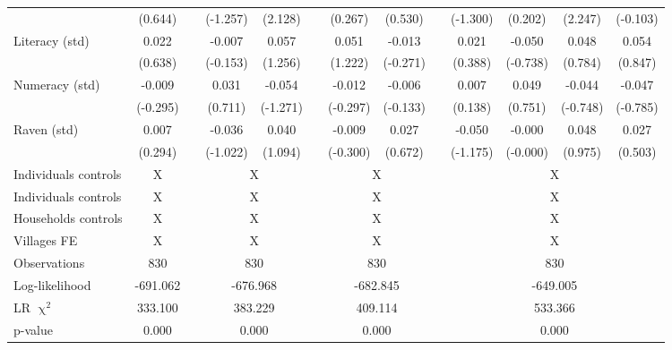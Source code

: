 \begin{table}[htbp]
{\begin{tabular}{lcccccccccccc}
          & (0.644) &       & (-1.257) & (2.128) &       & (0.267) & (0.530) &       & (-1.300) & (0.202) & (2.247) & (-0.103) \\
    Literacy (std) & 0.022 &       & -0.007 & 0.057 &       & 0.051 & -0.013 &       & 0.021 & -0.050 & 0.048 & 0.054 \\
          & (0.638) &       & (-0.153) & (1.256) &       & (1.222) & (-0.271) &       & (0.388) & (-0.738) & (0.784) & (0.847) \\
    Numeracy (std) & -0.009 &       & 0.031 & -0.054 &       & -0.012 & -0.006 &       & 0.007 & 0.049 & -0.044 & -0.047 \\
          & (-0.295) &       & (0.711) & (-1.271) &       & (-0.297) & (-0.133) &       & (0.138) & (0.751) & (-0.748) & (-0.785) \\
    Raven (std) & 0.007 &       & -0.036 & 0.040 &       & -0.009 & 0.027 &       & -0.050 & -0.000 & 0.048 & 0.027 \\
          & (0.294) &       & (-1.022) & (1.094) &       & (-0.300) & (0.672) &       & (-1.175) & (-0.000) & (0.975) & (0.503) \\
\cmidrule{1-2}\cmidrule{4-5}\cmidrule{7-8}\cmidrule{10-13}    Individuals controls & X     &       & \multicolumn{2}{c}{X} &       & \multicolumn{2}{c}{X} &       & \multicolumn{4}{c}{X} \\
    Individuals controls & \multicolumn{1}{c}{X} &       & \multicolumn{2}{c}{X} &       & \multicolumn{2}{c}{X} &       & \multicolumn{4}{c}{X} \\
    Households controls & \multicolumn{1}{c}{X} &       & \multicolumn{2}{c}{X} &       & \multicolumn{2}{c}{X} &       & \multicolumn{4}{c}{X} \\
    Villages FE & \multicolumn{1}{c}{X} &       & \multicolumn{2}{c}{X} &       & \multicolumn{2}{c}{X} &       & \multicolumn{4}{c}{X} \\
    \midrule
    Observations & 830   &       & \multicolumn{2}{c}{830} &       & \multicolumn{2}{c}{830} &       & \multicolumn{4}{c}{830} \\
    Log-likelihood & -691.062 &       & \multicolumn{2}{c}{-676.968} &       & \multicolumn{2}{c}{-682.845} &       & \multicolumn{4}{c}{-649.005} \\
    LR $\upchi^2$ & 333.100 &       & \multicolumn{2}{c}{383.229} &       & \multicolumn{2}{c}{409.114} &       & \multicolumn{4}{c}{533.366} \\
    p-value & 0.000 &       & \multicolumn{2}{c}{0.000} &       & \multicolumn{2}{c}{0.000} &       & \multicolumn{4}{c}{0.000} \\
    \bottomrule
    \end{tabular}%
    }
  \label{tab:ame_debtpath_b5}%
\end{table}%


